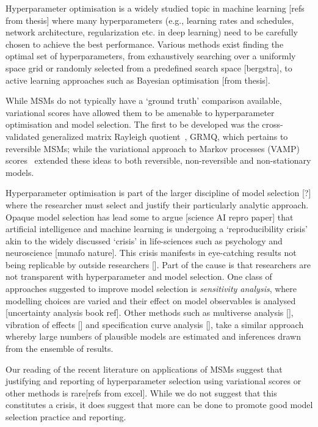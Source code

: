 \documentclass[journal=jacsat,manuscript=article]{achemso}
\begin{document}
Hyperparameter optimisation is a widely studied topic in machine learning [refs from thesis] where many hyperparameters (e.g., learning rates and schedules, network architecture, regularization etc. in deep learning) need to be carefully chosen to achieve the best performance. Various methods exist finding the optimal set of hyperparameters, from exhaustively searching over a uniformly space grid or randomly selected from a predefined search space [bergstra], to active learning approaches such as Bayesian optimisation [from thesis]. 

While MSMs do not typically have a `ground truth' comparison available, variational scores have allowed them to be amenable to hyperparameter optimisation and model selection. The first to be developed was the cross-validated generalized matrix Rayleigh quotient~\cite{mcgibbonVariationalCrossvalidationSlow2015}, GRMQ, which pertains to reversible MSMs; while the variational approach to Markov processes (VAMP) scores~\cite{ wuVariationalApproachLearning2020c, scherer_variational_2019} extended these ideas to both reversible, non-reversible and non-stationary models. 

Hyperparameter optimisation is part of the larger discipline of model selection [?] where the researcher must select and justify their particularly analytic approach. Opaque model selection has lead some to argue [science AI repro paper] that artificial intelligence and machine learning is undergoing a `reproducibility crisis' akin to the widely discussed `crisis' in life-sciences such as psychology and neuroscience [munafo nature]. This crisis manifests in eye-catching results not being replicable by outside researchers []. Part of the cause is that researchers are not transparent with hyperparameter and model selection. 
One class of approaches  suggested to improve model selection  is \emph{sensitivity analysis}, where modelling choices are varied and their effect on model observables is analysed [uncertainty analysis book ref]. Other methods such as multiverse analysis [], vibration of effects [] and specification curve analysis [], take a similar approach whereby large numbers of plausible models are estimated and inferences drawn from the ensemble of results. 

Our reading of the recent literature on applications of MSMs suggest that justifying and reporting of hyperparameter selection using variational scores or other methods is rare[refs from excel].  While we do not suggest that this constitutes a crisis, it does suggest that more can be done to promote good model selection practice and reporting. 
\end{document}

